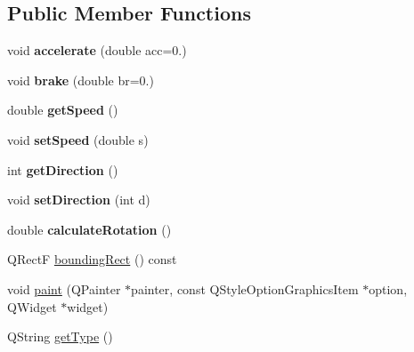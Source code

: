 \subsection*{Public Member Functions}
\begin{DoxyCompactItemize}
\item 
\mbox{\label{class_dynamic_obstacle_a5a4ea17aa7b7fe99f9a627aa762b1f5b}} 
void {\bfseries accelerate} (double acc=0.)
\item 
\mbox{\label{class_dynamic_obstacle_a158690143090a4b8001f411db9b6c1e0}} 
void {\bfseries brake} (double br=0.)
\item 
\mbox{\label{class_dynamic_obstacle_ab7968cfdaab0d81fcb75db774de1adb2}} 
double {\bfseries get\+Speed} ()
\item 
\mbox{\label{class_dynamic_obstacle_ab4ca72e5c4f18fdac9dd43cf26fe1d35}} 
void {\bfseries set\+Speed} (double s)
\item 
\mbox{\label{class_dynamic_obstacle_a3f4321cfcfd9c480bf779042228b8de1}} 
int {\bfseries get\+Direction} ()
\item 
\mbox{\label{class_dynamic_obstacle_ab1bf58416de0faf82f18c0d2c42ba000}} 
void {\bfseries set\+Direction} (int d)
\item 
\mbox{\label{class_dynamic_obstacle_a1ff562d7a0c22eb41cdd86f71d964a4e}} 
double {\bfseries calculate\+Rotation} ()
\item 
Q\+RectF \mbox{\hyperlink{class_dynamic_obstacle_ac1b0b15d722a45decc8b77fcde22efd0}{bounding\+Rect}} () const
\item 
void \mbox{\hyperlink{class_dynamic_obstacle_a30c0753280f05f69a9da89bc9d9ce3f6}{paint}} (Q\+Painter $\ast$painter, const Q\+Style\+Option\+Graphics\+Item $\ast$option, Q\+Widget $\ast$widget)
\item 
Q\+String \mbox{\hyperlink{class_dynamic_obstacle_ac52c38ef60b99a7a29f89b6eb23df460}{get\+Type}} ()
\item 
\mbox{\label{class_dynamic_obstacle_a6dae975b1b2abe86f62ab1df11d19293}} 

\end{DoxyCompactItemize}
